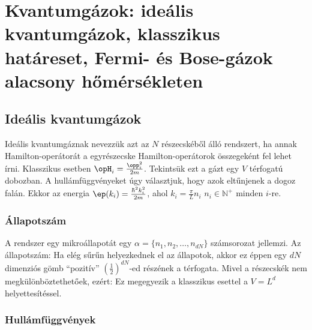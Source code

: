 \chapter{Kvantumg\'azok: ide\'alis kvantumg\'azok, klasszikus hat\'areset, Fermi- \'es Bose-g\'azok alacsony h\H{o}m\'ers\'ekleten}
 
 \section{Ideális kvantumgázok}
  
  Ideális kvantumgáznak nevezzük azt az $N$ részecskéből álló rendszert, ha annak Hamilton-operátorát a
  egyrészecske Hamilton-operátorok összegeként fel lehet írni.
   Klasszikus esetben $\opH_i=\frac{\opp_i^2}{2m}$.
   Tekintsük ezt a gázt egy $V$ térfogatú dobozban.
   A hullámfüggvényeket úgy választjuk, hogy azok eltűnjenek a dogoz falán.
   Ekkor az energia $\ep(k_i)=\frac{\hbar^2 k_i^2}{2m}$, ahol $k_i=\frac{\pi}{L}n_i$ $n_i\in\mathbb{N}^+$ minden $i$-re.
  
  \subsection{Állapotszám}
  
   A rendszer egy mikroállapotát egy $\alpha=\{n_1, n_2,\dots,n_{dN}\}$ számsorozat jellemzi.
   Az állapotszám:
   Ha elég sűrűn helyezkednek el az állapotok, akkor ez éppen egy $dN$ dimenziós gömb ``pozitív'' $\left(\frac{1}{2}\right)^{dN}$-ed részének a térfogata.
   Mivel a részecskék nem megkülönböztethetőek, ezért:
   Ez megegyezik a klasszikus esettel a $V=L^d$ helyettesítéssel.
   
  \subsection{Hullámfüggvények}
   
